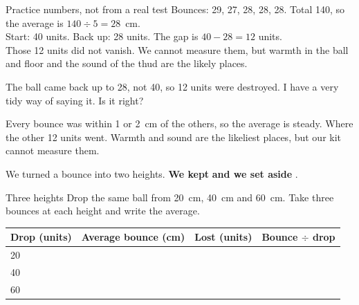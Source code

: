 \begin{worked}{Practice numbers, not from a real test}
Bounces: 29, 27, 28, 28, 28. Total 140, so the average is $140\div5=28$~cm.\\
Start: 40 units. Back up: 28 units. The gap is $40-28=12$ units.\\
Those 12 units did not vanish. We cannot measure them, but warmth in the ball and floor and the sound of the thud are the likely places.
\end{worked}

\begin{center}
\end{center}

\begin{multix}[hmm]\multixbot[hmm]\tcblower
The ball came back up to 28, not 40, so 12 units were destroyed. I have a very tidy way of saying it. Is it right?
\end{multix}

{Every bounce was within 1 or 2~cm of the others, so the average is steady.}
{Where the other 12 units went. Warmth and sound are the likeliest places, but our kit cannot measure them.}

\begin{keepbox}
We turned a bounce into two heights. \textbf{We kept} \wline[3.4cm] \textbf{and we set aside} \wline[3.4cm].
\end{keepbox}

\begin{tryit}{Three heights}
Drop the same ball from 20~cm, 40~cm and 60~cm. Take three bounces at each height and write the average.\par\medskip
\renewcommand{\arraystretch}{1.6}
\begin{tabular}{|l|c|c|c|}
\hline
\textbf{Drop (units)} & \textbf{Average bounce (cm)} & \textbf{Lost (units)} & \textbf{Bounce $\div$ drop}\\ \hline
20 & & & \\ \hline
40 & & & \\ \hline
60 & & & \\ \hline
\end{tabular}
\end{tryit}


